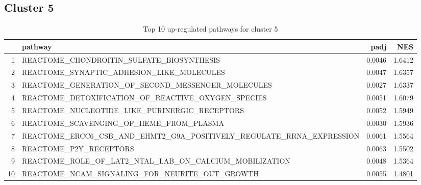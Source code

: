 \documentclass{article}
\begin{document}
\subsection{Cluster 5 }
\begin{table}[H]
\centering
\begin{tabularx}{\textwidth}{rlrr}
  \hline
 & pathway & padj & NES \\ 
  \hline
1 & REACTOME\_CHONDROITIN\_SULFATE\_BIOSYNTHESIS & 0.0046 & 1.6412 \\ 
  2 & REACTOME\_SYNAPTIC\_ADHESION\_LIKE\_MOLECULES & 0.0047 & 1.6357 \\ 
  3 & REACTOME\_GENERATION\_OF\_SECOND\_MESSENGER\_MOLECULES & 0.0027 & 1.6337 \\ 
  4 & REACTOME\_DETOXIFICATION\_OF\_REACTIVE\_OXYGEN\_SPECIES & 0.0051 & 1.6079 \\ 
  5 & REACTOME\_NUCLEOTIDE\_LIKE\_PURINERGIC\_RECEPTORS & 0.0052 & 1.5949 \\ 
  6 & REACTOME\_SCAVENGING\_OF\_HEME\_FROM\_PLASMA & 0.0030 & 1.5936 \\ 
  7 & REACTOME\_ERCC6\_CSB\_AND\_EHMT2\_G9A\_POSITIVELY\_REGULATE\_RRNA\_EXPRESSION & 0.0061 & 1.5564 \\ 
  8 & REACTOME\_P2Y\_RECEPTORS & 0.0063 & 1.5502 \\ 
  9 & REACTOME\_ROLE\_OF\_LAT2\_NTAL\_LAB\_ON\_CALCIUM\_MOBILIZATION & 0.0048 & 1.5364 \\ 
  10 & REACTOME\_NCAM\_SIGNALING\_FOR\_NEURITE\_OUT\_GROWTH & 0.0055 & 1.4801 \\ 
   \hline
\end{tabularx}
\caption{Top 10 up-regulated pathways for cluster 5} 
\label{tab:q3_2_5}
\end{table}
\end{document}
